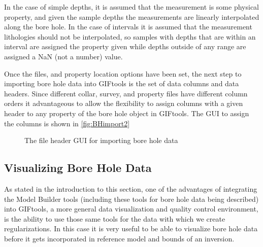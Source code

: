 In the case of simple depths, it is assumed that the measurement is some physical property, and given the sample depths the measurements are linearly interpolated along the bore hole. In the case of intervals it is assumed that the measurement lithologies should not be interpolated, so samples with depths that are within an interval are assigned the property given while depths outside of any range are assigned a NaN (not a number) value.

Once the files, and property location options have been set, the next step to importing bore hole data into GIFtools is the set of data columns and data headers. Since different collar, survey, and property files have different column orders it advantageous to allow the flexibility to assign columns with a given header to any property of the bore hole object in GIFtools. The \ac{GUI} to assign the columns is shown in \autoref{fig:BHimport2}

 \begin{figure} [h]
    \centering
    \caption{The file header \ac{GUI} for importing bore hole data}
    \label{fig:BHimport2}
\end{figure}

\subsection{Visualizing Bore Hole Data}
\label{subsec:visBH}

As stated in the introduction to this section, one of the advantages of integrating the Model Builder tools (including these tools for bore hole data being described) into GIFtools, a more general data visualization and quality control environment, is the ability to use those same tools for the data with which we create regularizations. In this case it is very useful to be able to visualize bore hole data before it gets incorporated in reference model and bounds of an inversion. 

